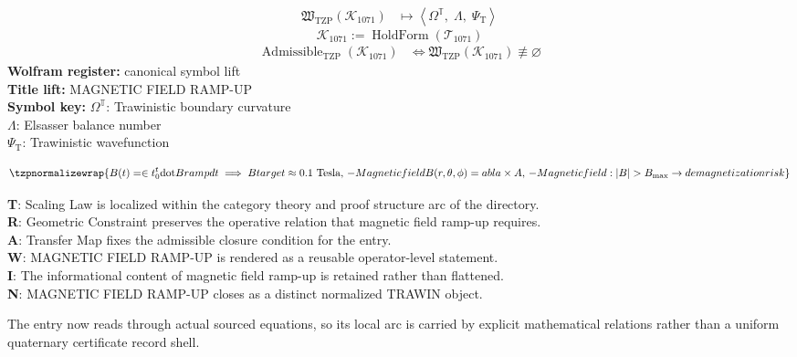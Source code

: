 \noindent
\begin{minipage}[t]{0.48\linewidth}
\begingroup
\small
\[
\begin{aligned}
\mathfrak{W}_{\mathrm{TZP}}\!\left(\mathcal{K}_{1071}\right)
&\longmapsto
\left\langle \Omega^{\mathbb{T}},\; \Lambda,\; \Psi_{\mathrm{T}} \right\rangle
\end{aligned}
\]
\[
\mathcal{K}_{1071}
:=
\operatorname{HoldForm}\!\left(\mathcal{T}_{1071}\right)
\]
\[
\begin{aligned}
\operatorname{Admissible}_{\mathrm{TZP}}\!\left(\mathcal{K}_{1071}\right)
&\Longleftrightarrow
\mathfrak{W}_{\mathrm{TZP}}\!\left(\mathcal{K}_{1071}\right)\not\equiv\varnothing
\end{aligned}
\]
\textbf{Wolfram register:} canonical symbol lift\\
\textbf{Title lift:} MAGNETIC FIELD RAMP-UP\\
\textbf{Symbol key:} \(\Omega^{\mathbb{T}}\): Trawinistic boundary curvature\\ \(\Lambda\): Elsasser balance number\\ \(\Psi_{\mathrm{T}}\): Trawinistic wavefunction
\par
\endgroup
\end{minipage}\hfill
\begin{minipage}[t]{0.48\linewidth}
\[
\tzpnormalizewrap{B(t) = \in t_0^t \mathrm{dot}{B} {ramp} dt \implies B {target} \approx 0.1 \text{ Tesla},\,- Magnetic field B(r,\theta,\phi) =  abla \times A,\,- Magnetic field: |B| > B_{\mathrm{max}} \to demagnetization risk}
\]

\small
\textbf{T}: Scaling Law is localized within the category theory and proof structure arc of the directory.\\
\textbf{R}: Geometric Constraint preserves the operative relation that magnetic field ramp-up requires.\\
\textbf{A}: Transfer Map fixes the admissible closure condition for the entry.\\
\textbf{W}: MAGNETIC FIELD RAMP-UP is rendered as a reusable operator-level statement.\\
\textbf{I}: The informational content of magnetic field ramp-up is retained rather than flattened.\\
\textbf{N}: MAGNETIC FIELD RAMP-UP closes as a distinct normalized TRAWIN object.
\normalsize
\end{minipage}

The entry now reads through actual sourced equations, so its local arc is carried by explicit mathematical relations rather than a uniform quaternary certificate record shell.
\clearpage


